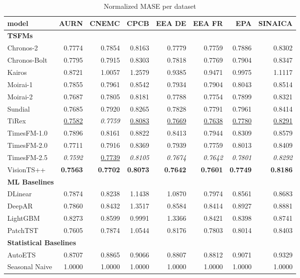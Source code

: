 \begin{table}[H]
\caption{Normalized MASE per dataset}
\centering
\begin{small}
\begin{tabular}{lrrrrrrr}
\toprule
model & AURN & CNEMC & CPCB & EEA DE & EEA FR & EPA & SINAICA \\
\midrule
\multicolumn{8}{l}{\textbf{TSFMs}} \\
Chronos-2 & 0.7774 & 0.7854 & 0.8163 & 0.7779 & 0.7759 & 0.7886 & 0.8302 \\
Chronos-Bolt & 0.7795 & 0.7915 & 0.8303 & 0.7818 & 0.7769 & 0.7904 & 0.8347 \\
Kairos & 0.8721 & 1.0057 & 1.2579 & 0.9385 & 0.9471 & 0.9975 & 1.1117 \\
Moirai-1 & 0.7855 & 0.7961 & 0.8542 & 0.7934 & 0.7904 & 0.8043 & 0.8514 \\
Moirai-2 & 0.7687 & 0.7805 & 0.8181 & 0.7788 & 0.7754 & 0.7899 & 0.8321 \\
Sundial & 0.7685 & 0.7920 & 0.8265 & 0.7828 & 0.7791 & 0.7961 & 0.8414 \\
TiRex & \underline{0.7582} & \textit{0.7759} & \underline{0.8083} & \underline{0.7669} & \underline{0.7638} & \underline{0.7780} & \underline{0.8291} \\
TimesFM-1.0 & 0.7896 & 0.8161 & 0.8822 & 0.8413 & 0.7944 & 0.8309 & 0.8579 \\
TimesFM-2.0 & 0.7711 & 0.7916 & 0.8369 & 0.7939 & 0.7759 & 0.8013 & 0.8409 \\
TimesFM-2.5 & \textit{0.7592} & \underline{0.7739} & \textit{0.8105} & \textit{0.7674} & \textit{0.7642} & \textit{0.7801} & \textit{0.8292} \\
VisionTS++ & \textbf{0.7563} & \textbf{0.7702} & \textbf{0.8073} & \textbf{0.7642} & \textbf{0.7601} & \textbf{0.7749} & \textbf{0.8186} \\
\midrule
\multicolumn{8}{l}{\textbf{ML Baselines}} \\
DLinear & 0.7874 & 0.8238 & 1.1438 & 1.0870 & 0.7974 & 0.8561 & 0.8683 \\
DeepAR & 0.7860 & 0.8432 & 1.3517 & 0.8584 & 0.8414 & 0.8927 & 0.8881 \\
LightGBM & 0.8273 & 0.8599 & 0.9991 & 1.3366 & 0.8421 & 0.8398 & 0.8741 \\
PatchTST & 0.7605 & 0.7874 & 1.0544 & 0.8176 & 0.7803 & 0.8014 & 0.8403 \\
\midrule
\multicolumn{8}{l}{\textbf{Statistical Baselines}} \\
AutoETS & 0.8707 & 0.8865 & 0.9066 & 0.8807 & 0.8812 & 0.9071 & 0.9329 \\
Seasonal Naive & 1.0000 & 1.0000 & 1.0000 & 1.0000 & 1.0000 & 1.0000 & 1.0000 \\
\bottomrule
\end{tabular}
\end{small}
\end{table}